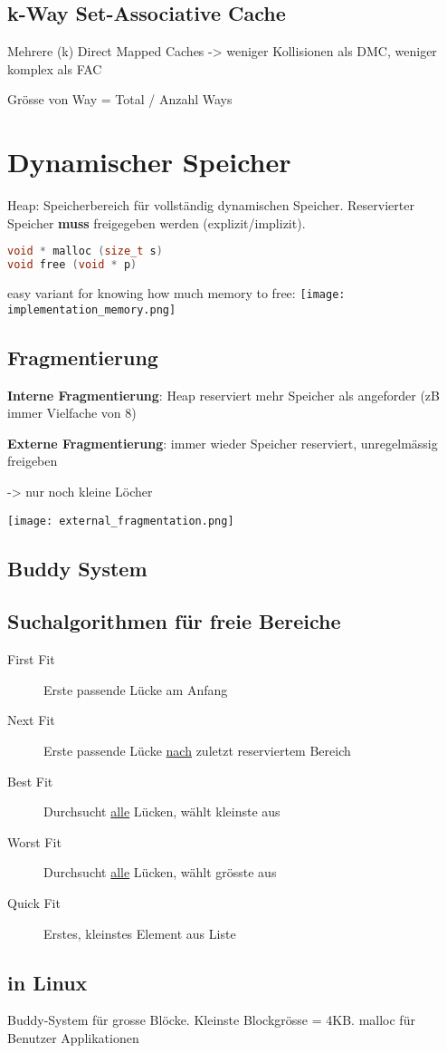 \begin{multicols*}{4}
\subsection{k-Way Set-Associative Cache}
Mehrere (k) Direct Mapped Caches -> weniger Kollisionen als DMC, weniger komplex als FAC

Grösse von Way = Total / Anzahl Ways

\section{Dynamischer Speicher}
Heap: Speicherbereich für vollständig dynamischen Speicher. Reservierter Speicher \textbf{muss} freigegeben werden (explizit/implizit).

\begin{lstlisting}[language=c]
void * malloc (size_t s)
void free (void * p)
\end{lstlisting}

easy variant for knowing how much memory to free:
\texttt{[image: implementation\_memory.png]}

\subsection{Fragmentierung}
\textbf{Interne Fragmentierung}: Heap reserviert mehr Speicher als angeforder (zB immer Vielfache von 8)

\textbf{Externe Fragmentierung}: immer wieder Speicher reserviert, unregelmässig freigeben

-> nur noch kleine Löcher

\texttt{[image: external\_fragmentation.png]}

\subsection{Buddy System}

\subsection{Suchalgorithmen für freie Bereiche}
\begin{description}
    \item[First Fit] Erste passende Lücke am Anfang
    \item[Next Fit] Erste passende Lücke \underline{nach} zuletzt reserviertem Bereich
    \item[Best Fit] Durchsucht \underline{alle} Lücken, wählt kleinste aus
    \item[Worst Fit] Durchsucht \underline{alle} Lücken, wählt grösste aus
    \item[Quick Fit] Erstes, kleinstes Element aus Liste
\end{description}

\subsection{in Linux}
Buddy-System für grosse Blöcke. Kleinste Blockgrösse = 4KB. malloc für Benutzer Applikationen

\end{multicols*}
